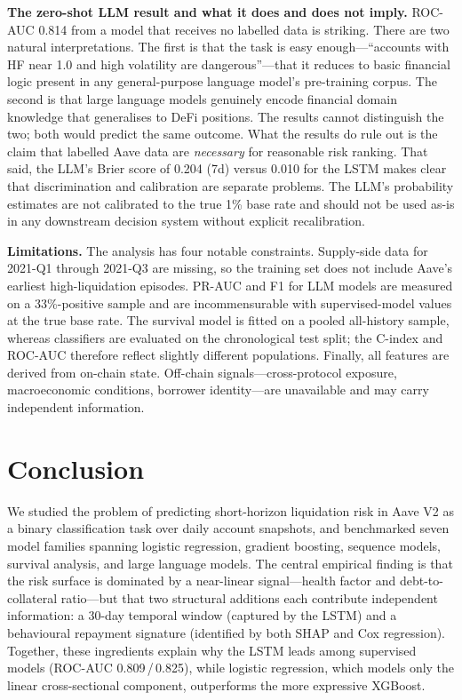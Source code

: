 \documentclass[12pt,a4paper]{article}
\begin{document}
\textbf{The zero-shot LLM result and what it does and does not imply.}
ROC-AUC 0.814 from a model that receives no labelled data is striking.
There are two natural interpretations.  The first is that the task is
easy enough---``accounts with HF near 1.0 and high volatility are
dangerous''---that it reduces to basic financial logic present in any
general-purpose language model's pre-training corpus.  The second is that
large language models genuinely encode financial domain knowledge that
generalises to DeFi positions.  The results cannot distinguish the two;
both would predict the same outcome.  What the results do rule out is the
claim that labelled Aave data are \emph{necessary} for reasonable
risk ranking.  That said, the LLM's Brier score of 0.204 (7d) versus
0.010 for the LSTM makes clear that discrimination and calibration are
separate problems.  The LLM's probability estimates are not calibrated to
the true 1\% base rate and should not be used as-is in any downstream
decision system without explicit recalibration.

\textbf{Limitations.}
The analysis has four notable constraints.  Supply-side data for
2021-Q1 through 2021-Q3 are missing, so the training set does not
include Aave's earliest high-liquidation episodes.
PR-AUC and F1 for LLM models are measured on a 33\%-positive sample
and are incommensurable with supervised-model values at the true base
rate.  The survival model is fitted on a pooled all-history sample,
whereas classifiers are evaluated on the chronological test split;
the C-index and ROC-AUC therefore reflect slightly different populations.
Finally, all features are derived from on-chain state.  Off-chain
signals---cross-protocol exposure, macroeconomic conditions, borrower
identity---are unavailable and may carry independent information.


\section{Conclusion}
\label{sec:conclusion}

We studied the problem of predicting short-horizon liquidation risk in Aave
V2 as a binary classification task over daily account snapshots, and
benchmarked seven model families spanning logistic regression, gradient
boosting, sequence models, survival analysis, and large language models.
The central empirical finding is that the risk surface is dominated by a
near-linear signal---health factor and debt-to-collateral ratio---but that
two structural additions each contribute independent information: a 30-day
temporal window (captured by the LSTM) and a behavioural repayment
signature (identified by both SHAP and Cox regression).  Together, these
ingredients explain why the LSTM leads among supervised models
(ROC-AUC 0.809\,/\,0.825), while logistic regression, which models only
the linear cross-sectional component, outperforms the more expressive
XGBoost.
\end{document}
